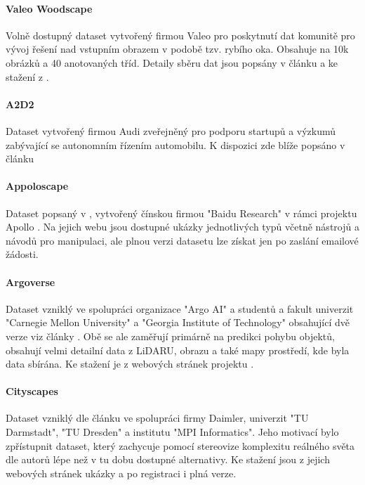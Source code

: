 \documentclass[czech, bc, kky, he, iso690numb]{fasthesis}
\begin{document}
    		\paragraph{Valeo Woodscape}
    			Volně dostupný dataset vytvořený firmou Valeo pro poskytnutí dat komunitě pro vývoj řešení nad vstupním obrazem v podobě tzv. rybího oka. Obsahuje na 10k obrázků a 40 anotovaných tříd. Detaily sběru dat jsou popsány v článku \cite{woodscape} a ke stažení z \cite{dataset_woodscape}.
    		\paragraph{A2D2}
    			Dataset vytvořený firmou Audi zveřejněný pro podporu startupů a výzkumů zabývající se autonomním řízením automobilu. K dispozici zde \cite{dataset_A2D2} blíže popsáno v článku \cite{a2d2}
    		\paragraph{Appoloscape}
    			Dataset popsaný v \cite{dataset_ApolloScape_paper}, vytvořený čínskou firmou "Baidu Research" v rámci projektu Apollo \cite{Apollo}. Na jejich webu \cite{dataset_ApolloScape} jsou dostupné ukázky jednotlivých typů včetně nástrojů a návodů pro manipulaci, ale plnou verzi datasetu lze získat jen po zaslání emailové žádosti.
    		\paragraph{Argoverse}
    			Dataset vzniklý ve spolupráci organizace "Argo AI" a studentů a fakult univerzit "Carnegie Mellon University" a "Georgia Institute of Technology"  obsahující dvě verze viz články \cite{dataset_Argoverse1_paper, dataset_Argoverse2_paper}. Obě se ale zaměřují primárně na predikci pohybu objektů, obsahují velmi detailní data z LiDARU, obrazu a také mapy prostředí, kde byla data sbírána. Ke stažení je z webových stránek projektu \cite{dataset_Argoverse}.
   			\paragraph{Cityscapes}
   				Dataset vzniklý dle článku \cite{dataset_cityscapes_paper} ve spolupráci firmy Daimler, univerzit "TU Darmstadt", "TU Dresden" a institutu "MPI Informatics". Jeho motivací bylo zpřístupnit dataset, který zachycuje pomocí stereovize komplexitu reálného světa dle autorů lépe než v tu dobu dostupné alternativy. Ke stažení jsou z jejich webových stránek \cite{dataset_cityscapes} ukázky a po registraci i plná verze.
\end{document}
